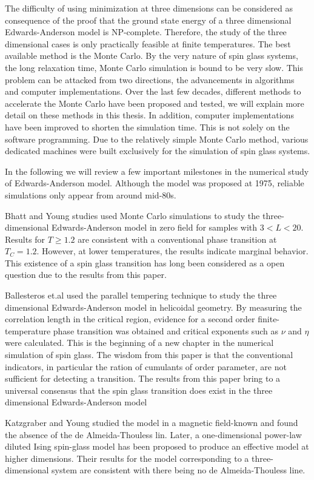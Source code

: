 The difficulty of using minimization at three dimensions can be 
considered as consequence of the proof that the ground state energy of a three dimensional
Edwards-Anderson model is NP-complete. Therefore, the study of the three dimensional
cases is only practically feasible at finite temperatures. The best available method
is the Monte Carlo. By the very nature of spin glass systems, the long relaxation time, 
Monte Carlo simulation is bound to be very slow. This problem can be attacked from 
two directions, the advancements in algorithms and computer implementations. 
Over the last few decades, different methods to accelerate the Monte Carlo 
have been proposed and tested, we will explain more detail on these methods in this thesis. 
In addition, computer implementations have been improved to shorten the simulation
time. This is not solely on the software programming. Due to the relatively 
simple Monte Carlo method, various dedicated machines were built exclusively for the simulation
of spin glass systems. 

In the following we will review a few important milestones in the numerical study of
Edwards-Anderson model. Although the model was proposed at 1975, reliable simulations
only appear from around mid-80s.

Bhatt and Young studies used Monte Carlo simulations to study the three-dimensional
Edwards-Anderson model in zero field for samples with $3<L<20$. Results for 
$T\ge1.2$ are consistent with a conventional phase transition at $T_C=1.2$.
However, at lower temperatures, the results indicate marginal behavior. This existence
of a spin glass transition has long been considered as a open question due to the
results from this paper. 

Ballesteros et.al used the parallel tempering technique to study the three dimensional
Edwards-Anderson model in helicoidal geometry. By measuring the correlation length
in the critical region,  evidence for a second order finite-temperature phase 
transition was obtained and critical exponents such as $\nu$ and $\eta$ were 
calculated. This is the beginning of a new chapter in the numerical simulation 
of spin glass. The wisdom from this paper is that the conventional indicators,
in particular the ration of cumulants of order parameter, are not sufficient 
for detecting a transition. The results from this paper bring to a universal
consensus that the spin glass transition does exist in the three dimensional
Edwards-Anderson model

Katzgraber and Young studied the model in a magnetic field-known and 
found the absence of the de Almeida-Thouless lin. Later, a one-dimensional 
power-law diluted Ising spin-glass model has been proposed to produce an
effective model at higher dimensions. Their results for the model 
corresponding to a three-dimensional system are consistent with there being no 
de Almeida-Thouless line.

